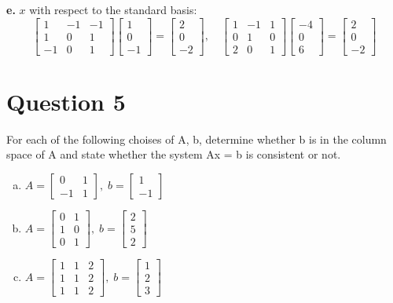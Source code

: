 \documentclass{article}
\begin{document}
\textbf{e.} $x$ with respect to the standard basis:
$$
\begin{bmatrix} 1 & -1 & -1 \\ 1 & 0 & 1 \\ -1 & 0 & 1 \end{bmatrix} \begin{bmatrix} 1 \\ 0 \\ -1 \end{bmatrix}
= \begin{bmatrix} 2 \\ 0 \\ -2 \end{bmatrix}
, \quad
\begin{bmatrix} 1 & -1 & 1 \\ 0 & 1 & 0 \\ 2 & 0 & 1 \end{bmatrix} \begin{bmatrix} -4 \\ 0 \\ 6 \end{bmatrix}
= \begin{bmatrix} 2 \\ 0 \\ -2 \end{bmatrix}
$$

\newpage
\section*{Question 5}
For each of the following choises of A, b, determine whether b is in the column space of A and state whether the system Ax = b is consistent or not.
\begin{enumerate}[a.]
    \item $A = \begin{bmatrix} 0 & 1 \\ -1 & 1 \end{bmatrix}, \; b = \begin{bmatrix} 1 \\ -1 \end{bmatrix}$
    \item $A = \begin{bmatrix} 0 & 1 \\ 1 & 0 \\ 0 & 1 \end{bmatrix}, \; b = \begin{bmatrix} 2 \\ 5 \\ 2 \end{bmatrix}$
    \item $A = \begin{bmatrix} 1 & 1 & 2 \\ 1 & 1 & 2 \\ 1 & 1 & 2 \end{bmatrix}, \; b = \begin{bmatrix} 1 \\ 2 \\ 3 \end{bmatrix}$
\end{enumerate}
\end{document}
